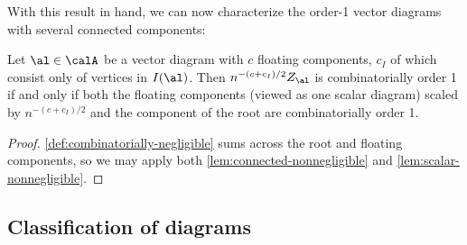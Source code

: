 \documentclass[12pt]{article}
\begin{document}
With this result in hand, we can now characterize the order-1 vector diagrams with several connected components:

\begin{corollary}\label{cor:classify-full}
    Let $\al \in \calA$ be a vector diagram with $c$ floating components, $c_I$
of which consist only of vertices in $I(\al)$. Then $n^{-(c+c_I)/2}Z_\al$ is combinatorially order 1 if and only if both the floating components (viewed as one scalar diagram) scaled by $n^{-(c+c_I)/2}$ and the component of the root are combinatorially order 1.
\end{corollary}
\begin{proof}
    \cref{def:combinatorially-negligible} sums across the root and floating components, so we may
    apply both \cref{lem:connected-nonnegligible} and \cref{lem:scalar-nonnegligible}.
\end{proof} 
\subsection{Classification of diagrams}
\label{sec:diagram-classification-proof}
\end{document}
